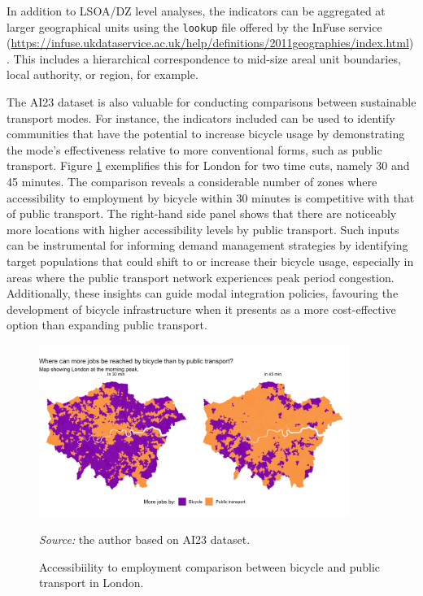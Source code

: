 \documentclass{article}
\begin{document}
In addition to LSOA/DZ level analyses, the indicators can be aggregated
at larger geographical units using the \texttt{lookup} file offered by
the InFuse service
(\url{https://infuse.ukdataservice.ac.uk/help/definitions/2011geographies/index.html}).
This includes a hierarchical correspondence to mid-size areal unit
boundaries, local authority, or region, for example.

The AI23 dataset is also valuable for conducting comparisons between
sustainable transport modes. For instance, the indicators included can
be used to identify communities that have the potential to increase
bicycle usage by demonstrating the mode's effectiveness relative to more
conventional forms, such as public transport. Figure
\ref{fig:bike-comparison} exemplifies this for London for two time cuts,
namely 30 and 45 minutes. The comparison reveals a considerable number
of zones where accessibility to employment by bicycle within 30 minutes
is competitive with that of public transport. The right-hand side panel
shows that there are noticeably more locations with higher accessibility
levels by public transport. Such inputs can be instrumental for
informing demand management strategies by identifying target populations
that could shift to or increase their bicycle usage, especially in areas
where the public transport network experiences peak period congestion.
Additionally, these insights can guide modal integration policies,
favouring the development of bicycle infrastructure when it presents as
a more cost-effective option than expanding public transport.

\begin{figure}[!htbp]
  \centering
  \includegraphics[width=0.9\textwidth]{../plots/pt_vs_bike_map}
  \caption{Accessibiility to employment comparison between bicycle and public transport in London.}
  \footnotesize{\textit{Source:} the author based on AI23 dataset.}
  \label{fig:bike-comparison}
\end{figure}
\end{document}

